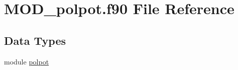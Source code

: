 \hypertarget{MOD__polpot_8f90}{\section{M\-O\-D\-\_\-polpot.\-f90 File Reference}
\label{MOD__polpot_8f90}
}
\subsection*{Data Types}
\begin{DoxyCompactItemize}
\item 
module \hyperlink{classpolpot}{polpot}
\end{DoxyCompactItemize}
